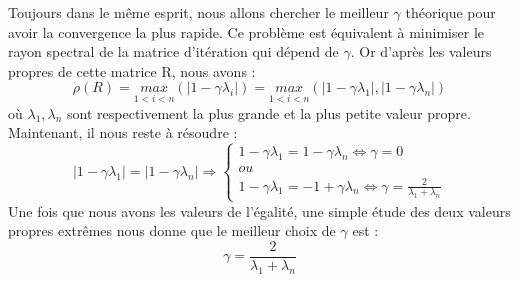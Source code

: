 Toujours dans le même esprit, nous allons chercher le meilleur $\gamma$ théorique pour avoir la convergence la plus rapide. Ce problème est équivalent à minimiser le rayon spectral de la matrice d'itération qui dépend de $\gamma$. Or d'après les valeurs propres de cette matrice R, nous avons : 
\begin{equation}
	\rho(R) = \underset{1<i<n}{max}(|1 - \gamma\lambda_i|) = \underset{1<i<n}{max}(|1 - \gamma\lambda_1|, |1 - \gamma\lambda_n|)
\end{equation}
où $\lambda_1, \lambda_n$ sont respectivement la plus grande et la plus petite valeur propre. Maintenant, il nous reste à résoudre : 
\begin{equation}
|1 - \gamma\lambda_1| =  |1 - \gamma\lambda_n| \Rightarrow 
\begin{cases}
1 - \gamma\lambda_1 = 1 - \gamma\lambda_n \Leftrightarrow \gamma = 0\\
ou\\
1 - \gamma\lambda_1 = - 1 + \gamma\lambda_n \Leftrightarrow \gamma = \frac{2}{\lambda_1 + \lambda_n}
\end{cases}
\end{equation}
Une fois que nous avons les valeurs de l'égalité, une simple étude des deux valeurs propres extrêmes nous donne que le meilleur choix de $\gamma$ est : 
\begin{equation}
\gamma = \frac{2}{\lambda_1 + \lambda_n}
\end{equation}
